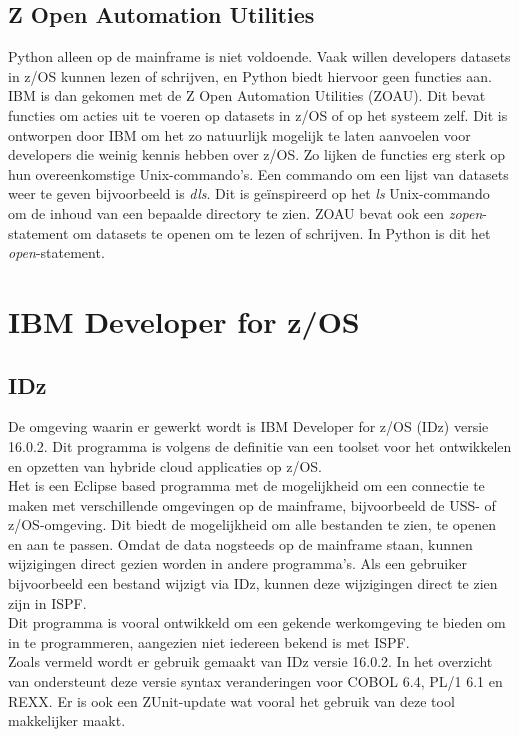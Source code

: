 \subsection{Z Open Automation Utilities}
Python alleen op de mainframe is niet voldoende. Vaak willen developers datasets in z/OS kunnen lezen of schrijven, en Python biedt hiervoor geen functies aan. IBM is dan gekomen met de Z Open Automation Utilities (ZOAU). Dit bevat functies om acties uit te voeren op datasets in z/OS of op het systeem zelf. Dit is ontworpen door IBM om het zo natuurlijk mogelijk te laten aanvoelen voor developers die weinig kennis hebben over z/OS. Zo lijken de functies erg sterk op hun overeenkomstige Unix-commando's. Een commando om een lijst van datasets weer te geven bijvoorbeeld is \textit{dls}. Dit is geïnspireerd op het \textit{ls} Unix-commando om de inhoud van een bepaalde directory te zien. ZOAU bevat ook een \textit{zopen}-statement om datasets te openen om te lezen of schrijven. In Python is dit het \textit{open}-statement. \autocite{IBM2023a}

\section{IBM Developer for z/OS}
\label{sec:IBM Developer for z/OS (IDz)}
\subsection{IDz}
De omgeving waarin er gewerkt wordt is IBM Developer for z/OS (IDz) versie 16.0.2. Dit programma is volgens de definitie van \textcite{Spohn2023} een toolset voor het ontwikkelen en opzetten van hybride cloud applicaties op z/OS. \\
Het is een Eclipse based programma met de mogelijkheid om een connectie te maken met verschillende omgevingen op de mainframe, bijvoorbeeld de USS- of z/OS-omgeving. Dit biedt de mogelijkheid om alle bestanden te zien, te openen en aan te passen. Omdat de data nogsteeds op de mainframe staan, kunnen wijzigingen direct gezien worden in andere programma's. Als een gebruiker bijvoorbeeld een bestand wijzigt via IDz, kunnen deze wijzigingen direct te zien zijn in ISPF. \\
Dit programma is vooral ontwikkeld om een gekende werkomgeving te bieden om in te programmeren, aangezien niet iedereen bekend is met ISPF. \\

Zoals vermeld wordt er gebruik gemaakt van IDz versie 16.0.2. In het overzicht van \textcite{IBM2024} ondersteunt deze versie syntax veranderingen voor COBOL 6.4, PL/1 6.1 en REXX. Er is ook een ZUnit-update wat vooral het gebruik van deze tool makkelijker maakt. \\


